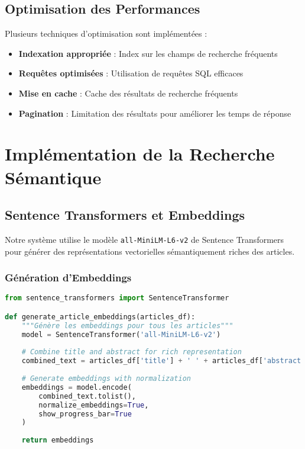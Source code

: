 \documentclass[12pt,a4paper]{article}
\begin{document}
\subsection{Optimisation des Performances}

Plusieurs techniques d'optimisation sont implémentées :

\begin{itemize}
    \item \textbf{Indexation appropriée} : Index sur les champs de recherche fréquents
    \item \textbf{Requêtes optimisées} : Utilisation de requêtes SQL efficaces
    \item \textbf{Mise en cache} : Cache des résultats de recherche fréquents
    \item \textbf{Pagination} : Limitation des résultats pour améliorer les temps de réponse
\end{itemize}

\section{Implémentation de la Recherche Sémantique}

\subsection{Sentence Transformers et Embeddings}

Notre système utilise le modèle \texttt{all-MiniLM-L6-v2} de Sentence Transformers \cite{reimers2019sentencebert} pour générer des représentations vectorielles sémantiquement riches des articles.

\subsubsection{Génération d'Embeddings}

\begin{lstlisting}[language=Python, caption=Génération d'embeddings pour les articles]
from sentence_transformers import SentenceTransformer

def generate_article_embeddings(articles_df):
    """Génère les embeddings pour tous les articles"""
    model = SentenceTransformer('all-MiniLM-L6-v2')
    
    # Combine title and abstract for rich representation
    combined_text = articles_df['title'] + ' ' + articles_df['abstract']
    
    # Generate embeddings with normalization
    embeddings = model.encode(
        combined_text.tolist(),
        normalize_embeddings=True,
        show_progress_bar=True
    )
    
    return embeddings
\end{lstlisting}
\end{document}
